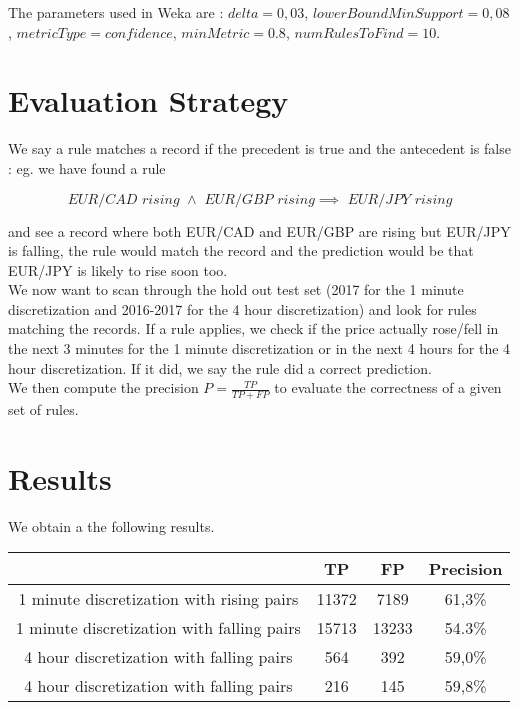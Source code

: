 \documentclass[paper=a4,fontsize=11pt,DIV=8,BCOR=5mm,twoside,pdftex]{scrartcl}
\begin{document}
	The parameters used in Weka are : $delta = 0,03$, $lowerBoundMinSupport = 0,08$, $metricType = confidence$, $minMetric = 0.8$, $numRulesToFind = 10$.
	
	\section{Evaluation Strategy}
	
	We say a rule matches a record if the precedent is true and the antecedent is false : eg. we have found a rule 
	
	\begin{equation}\nonumber
		\textit{EUR/CAD rising }\land\textit{ EUR/GBP rising} \implies \textit{ EUR/JPY rising}
	\end{equation}
	
	and see a record where both EUR/CAD and EUR/GBP are rising but EUR/JPY is falling, the rule would match the record and the prediction would be that EUR/JPY is likely to rise soon too.\\
	
	 We now want to scan through the hold out test set (2017 for the 1 minute discretization and 2016-2017 for the 4 hour discretization) and look for rules matching the records. If a rule applies, we check if the price actually rose/fell in the next 3 minutes for the 1 minute discretization or in the next 4 hours for the 4 hour discretization. If it did, we say the rule did a correct prediction.\\
	
	We then compute the precision $P = \frac{TP}{TP+FP}$ to evaluate the correctness of a given set of rules.\\
	
	\section{Results}
	
	We obtain a the following results.
	
	\begin{center}
		\begin{tabular}{ |c|c|c|c| }
			\hline
			&TP&FP&Precision\\
			\hline
			1 minute discretization with rising pairs&11372&7189&61,3\%\\
			1 minute discretization with falling pairs&15713&13233&54.3\%\\
			4 hour discretization with falling pairs&564&392&59,0\%\\
			4 hour discretization with falling pairs&216&145&59,8\%\\
			\hline
		\end{tabular}
	\end{center}
	
\end{document}
